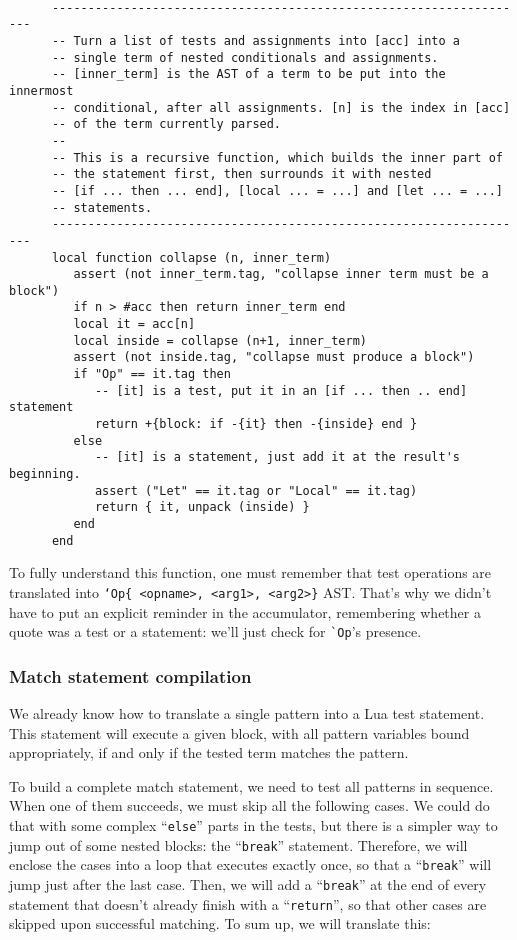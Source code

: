 \begin{Verbatim}[fontsize=\scriptsize]

      -------------------------------------------------------------------
      -- Turn a list of tests and assignments into [acc] into a
      -- single term of nested conditionals and assignments.
      -- [inner_term] is the AST of a term to be put into the innermost
      -- conditional, after all assignments. [n] is the index in [acc]
      -- of the term currently parsed.
      -- 
      -- This is a recursive function, which builds the inner part of
      -- the statement first, then surrounds it with nested 
      -- [if ... then ... end], [local ... = ...] and [let ... = ...]
      -- statements.
      -------------------------------------------------------------------
      local function collapse (n, inner_term)
         assert (not inner_term.tag, "collapse inner term must be a block")
         if n > #acc then return inner_term end
         local it = acc[n]
         local inside = collapse (n+1, inner_term)
         assert (not inside.tag, "collapse must produce a block")
         if "Op" == it.tag then 
            -- [it] is a test, put it in an [if ... then .. end] statement
            return +{block: if -{it} then -{inside} end }
         else 
            -- [it] is a statement, just add it at the result's  beginning.
            assert ("Let" == it.tag or "Local" == it.tag)
            return { it, unpack (inside) }
         end
      end
\end{Verbatim}

To fully understand this function, one must remember that test
operations are translated into {\tt`Op\{ <opname>, <arg1>, <arg2>\}}
AST. That's why we didn't have to put an explicit reminder in the
accumulator, remembering whether a quote was a test or a statement:
we'll just check for \verb|`Op|'s presence.

\subsubsection{Match statement compilation}
We already know how to translate a single pattern into a Lua test
statement. This statement will execute a given block, with all pattern
variables bound appropriately, if and only if the tested term matches
the pattern.

To build a complete match statement, we need to test all patterns in
sequence. When one of them succeeds, we must skip all the following
cases. We could do that with some complex ``\verb|else|'' parts in the
tests, but there is a simpler way to jump out of some nested blocks:
the ``\verb|break|'' statement. Therefore, we will enclose the cases
into a loop that executes exactly once, so that a ``\verb|break|''
will jump just after the last case. Then, we will add a
``\verb|break|'' at the end of every statement that doesn't already
finish with a ``\verb|return|'', so that other cases are skipped upon
successful matching. To sum up, we will translate this:

